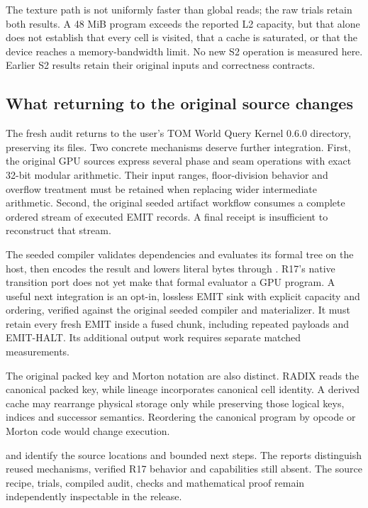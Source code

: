 The texture path is not uniformly faster than global reads; the raw trials
retain both results. A 48 MiB program exceeds the reported L2 capacity,
but that alone does not establish that every cell is visited, that a cache
is saturated, or that the device reaches a memory-bandwidth limit. No new
S2 operation is measured here. Earlier S2 results retain their original
inputs and correctness contracts.

\subsection{What returning to the original source changes}

The fresh audit returns to the user's TOM World Query Kernel 0.6.0
directory, preserving its files. Two concrete mechanisms deserve further
integration. First, the original GPU sources express several phase and
seam operations with exact 32-bit modular arithmetic. Their input ranges,
floor-division behavior and overflow treatment must be retained when
replacing wider intermediate arithmetic. Second, the original seeded
artifact workflow consumes a complete ordered stream of executed EMIT
records. A final receipt is insufficient to reconstruct that stream.

The seeded compiler validates dependencies and evaluates its formal tree
on the host, then encodes the result and lowers literal bytes through
. R17's native transition port does not yet make that
formal evaluator a GPU program. A useful next integration is an opt-in,
lossless EMIT sink with explicit capacity and ordering, verified against
the original seeded compiler and materializer. It must retain every fresh
EMIT inside a fused chunk, including repeated payloads and EMIT-HALT.
Its additional output work requires separate matched measurements.

The original packed key and Morton notation are also distinct. RADIX
reads the canonical packed key, while lineage incorporates canonical
cell identity. A derived cache may rearrange physical storage only while
preserving those logical keys, indices and successor semantics. Reordering
the canonical program by opcode or Morton code would change execution.

 and
 identify the source locations and
bounded next steps. The reports distinguish reused mechanisms, verified
R17 behavior and capabilities still absent. The source recipe, trials,
compiled audit, checks and mathematical proof remain independently
inspectable in the release.

\clearpage
